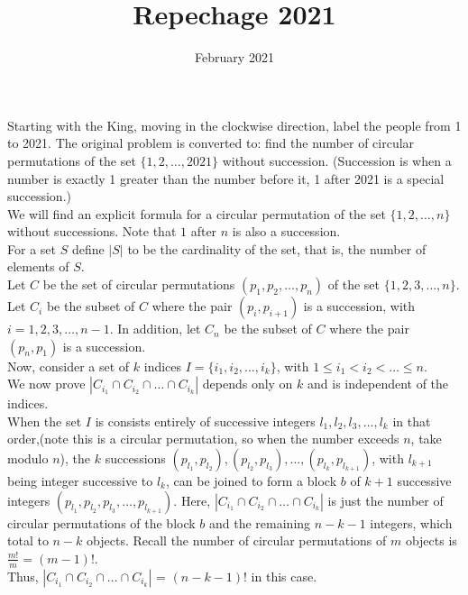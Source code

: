 \documentclass{article}
\title{Repechage 2021}
\date{February 2021}
\begin{document}
Starting with the King, moving in the clockwise direction, label the people from 1 to 2021. The original problem is converted to: find the number of circular permutations of the set $\{1,2, \dots , 2021\}$ without succession. (Succession is when a number is exactly 1 greater than the number before it, 1 after 2021 is a special succession.) \\

We will find an explicit formula for a circular permutation of the set $\{1,2,\dots , n\}$ without successions. Note that $1$ after $n$ is also a succession. \\

For a set $S$ define $|S|$ to be the cardinality of the set, that is, the number of elements of $S$. \\

Let $C$ be the set of circular permutations $(p_1,p_2,\dots , p_n)$ of the set $\{1,2,3,\dots , n\}$. \\
Let $C_i$ be the subset of $C$ where the pair $(p_i, p_{i + 1})$ is a succession, with $i = 1,2,3,\dots , n -1 $. In addition, let $C_n$ be the subset of $C$ where the pair $(p_n, p_1)$ is a succession. \\

Now, consider a set of $k$ indices $I = \{i_1,i_2, \dots , i_k \}$, with $1 \le i_1 < i_2 < \dots \le n$. \\
We now prove $\left| C_{i_1}\cap C_{i_2} \cap \dots \cap C_{i_k} \right|$ depends only on $k$ and is independent of the indices. \\

When the set $I$ is consists entirely of successive integers $l_1,l_2,l_3,\dots, l_k$ in that order,(note this is a circular permutation, so when the number exceeds $n$, take modulo $n$), the $k$ successions $(p_{l_1},p_{l_2}), (p_{l_2},p_{l_3}), \dots, (p_{l_k},p_{l_{k+1}})$, with $l_{k+1}$ being integer successive to $l_k$, can be joined to form a block $b$ of $k + 1$ successive integers $(p_{l_1},p_{l_2},p_{l_3}, \dots ,p_{l_{k+1}})$. Here, $\left| C_{i_1}\cap C_{i_2} \cap \dots \cap C_{i_k} \right|$ is just the number of circular permutations of the block $b$ and the remaining $n-k-1$ integers, which total to $n-k$ objects. Recall the number of circular permutations of $m$ objects is $\frac{m!}{m} = (m-1)!$. \\
Thus, $\left| C_{i_1}\cap C_{i_2} \cap \dots \cap C_{i_k} \right|$ =  $(n-k-1)!$ in this case. \\
\end{document}
